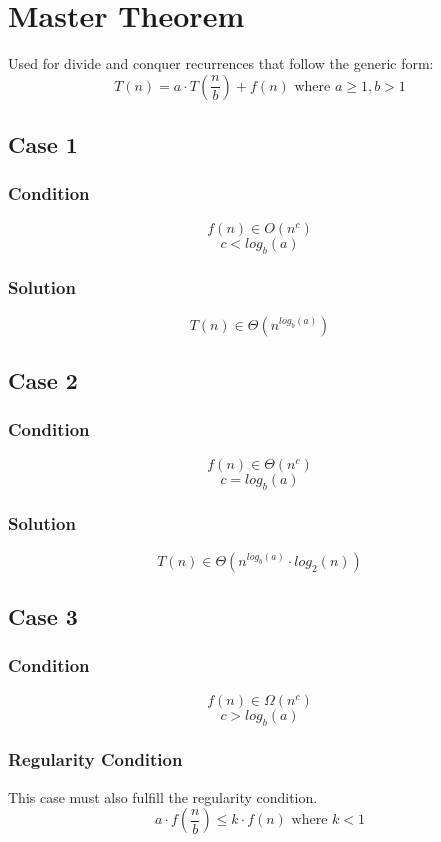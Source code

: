 \section{Master Theorem}
Used for divide and conquer recurrences that follow the generic form:
$$
T(n) = a \cdot T(\frac{n}{b}) + f(n) \text{ where } a \geq 1, b > 1
$$

\subsection{Case 1}

\subsubsection*{Condition}
$$
f(n) \in O(n^c)
$$
$$
c < log_b(a)
$$

\subsubsection*{Solution}
$$
T(n) \in \Theta(n^{log_b(a)})
$$

\subsection{Case 2}

\subsubsection*{Condition}
$$
f(n) \in \Theta(n^c)
$$
$$
c = log_b(a)
$$

\subsubsection*{Solution}
$$
T(n) \in \Theta(n^{log_b(a)} \cdot log_2(n) )
$$

\subsection{Case 3}

\subsubsection*{Condition}
$$
f(n) \in \Omega(n^c)
$$
$$
c > log_b(a)
$$

\subsubsection*{Regularity Condition}
This case must also fulfill the regularity condition.
$$
a \cdot f(\frac{n}{b}) \leq k \cdot f(n) \text{ where } k < 1
$$

